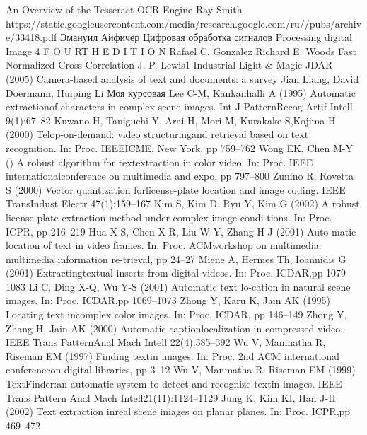 \documentclass[oneside,final,14pt]{extreport}
\begin{document}
\newpage
\begin{thebibliography}{0}
An Overview of the Tesseract OCR Engine ﻿Ray Smith
https://static.googleusercontent.com/media/research.google.com/ru//pubs/archive/33418.pdf
Эмануил Айфичер Цифровая обработка сигналов
 Processing digital Image 4 F O U RT H E D I T I O N Rafael C. Gonzalez Richard E. Woods
 Fast Normalized Cross-Correlation J. P. Lewis1 Industrial Light \& Magic
JDAR (2005)
﻿Camera-based analysis of text and documents: a survey
Jian Liang, David Doermann, Huiping Li
 Моя курсовая
Lee C-M, Kankanhalli A (1995) Automatic extractionof characters in complex scene images. Int J PatternRecog Artif Intell 9(1):67–82
Kuwano H, Taniguchi Y, Arai H, Mori M, Kurakake S,Kojima H (2000) Telop-on-demand: video structuringand retrieval based on text recognition. In: Proc. IEEEICME, New York, pp 759–762
 Wong EK, Chen M-Y () A robust algorithm for textextraction in color video. In: Proc. IEEE internationalconference on multimedia and expo, pp 797–800
 Zunino R, Rovetta S (2000) Vector quantization forlicense-plate location and image coding. IEEE TransIndust Electr 47(1):159–167
Kim S, Kim D, Ryu Y, Kim G (2002) A robust license-plate extraction method under complex image condi-tions. In: Proc. ICPR, pp 216–219
 Hua X-S, Chen X-R, Liu W-Y, Zhang H-J (2001) Auto-matic location of text in video frames. In: Proc. ACMworkshop on multimedia: multimedia information re-trieval, pp 24–27
Miene A, Hermes Th, Ioannidis G (2001) Extractingtextual inserts from digital videos. In: Proc. ICDAR,pp 1079–1083
Li C, Ding X-Q, Wu Y-S (2001) Automatic text lo-cation  in  natural  scene  images.  In:  Proc.  ICDAR,pp 1069–1073
  Zhong Y, Karu K, Jain AK (1995) Locating text incomplex color images. In: Proc. ICDAR, pp 146–149﻿
  Zhong Y, Zhang H, Jain AK (2000) Automatic captionlocalization in compressed video. IEEE Trans PatternAnal Mach Intell 22(4):385–392
Wu V, Manmatha R, Riseman EM (1997) Finding textin images. In: Proc. 2nd ACM international conferenceon digital libraries, pp 3–12
  Wu V, Manmatha R, Riseman EM (1999) TextFinder:an  automatic  system  to  detect  and  recognize  textin  images.  IEEE  Trans  Pattern  Anal  Mach  Intell21(11):1124–1129
 Jung K, Kim KI, Han J-H (2002) Text extraction inreal scene images on planar planes. In: Proc. ICPR,pp 469–472
\end{thebibliography}
\end{document}
